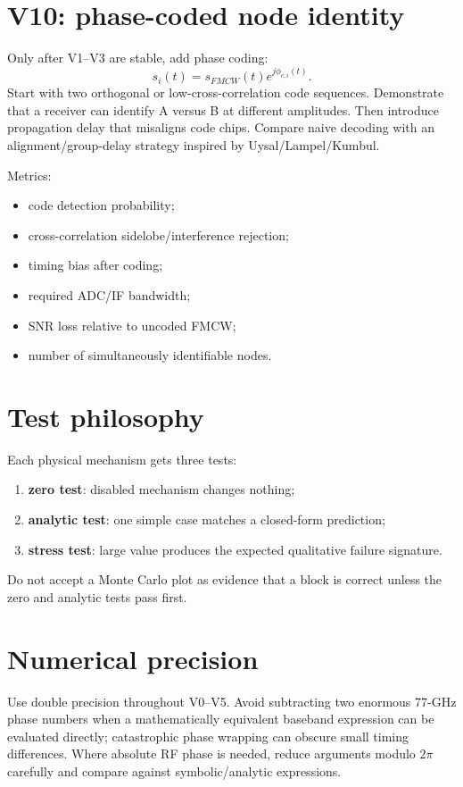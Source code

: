 \documentclass[11pt]{article}
\begin{document}
\section{V10: phase-coded node identity}
Only after V1--V3 are stable, add phase coding:
\[
s_i(t)=s_{FMCW}(t)e^{j\phi_{c,i}(t)}.
\]
Start with two orthogonal or low-cross-correlation code sequences. Demonstrate that a receiver can identify A versus B at different amplitudes. Then introduce propagation delay that misaligns code chips. Compare naive decoding with an alignment/group-delay strategy inspired by Uysal/Lampel/Kumbul.

Metrics:
\begin{itemize}
\item code detection probability;
\item cross-correlation sidelobe/interference rejection;
\item timing bias after coding;
\item required ADC/IF bandwidth;
\item SNR loss relative to uncoded FMCW;
\item number of simultaneously identifiable nodes.
\end{itemize}

\section{Test philosophy}
Each physical mechanism gets three tests:
\begin{enumerate}
\item \textbf{zero test}: disabled mechanism changes nothing;
\item \textbf{analytic test}: one simple case matches a closed-form prediction;
\item \textbf{stress test}: large value produces the expected qualitative failure signature.
\end{enumerate}
Do not accept a Monte Carlo plot as evidence that a block is correct unless the zero and analytic tests pass first.

\section{Numerical precision}
Use double precision throughout V0--V5. Avoid subtracting two enormous 77-GHz phase numbers when a mathematically equivalent baseband expression can be evaluated directly; catastrophic phase wrapping can obscure small timing differences. Where absolute RF phase is needed, reduce arguments modulo $2\pi$ carefully and compare against symbolic/analytic expressions.
\end{document}
